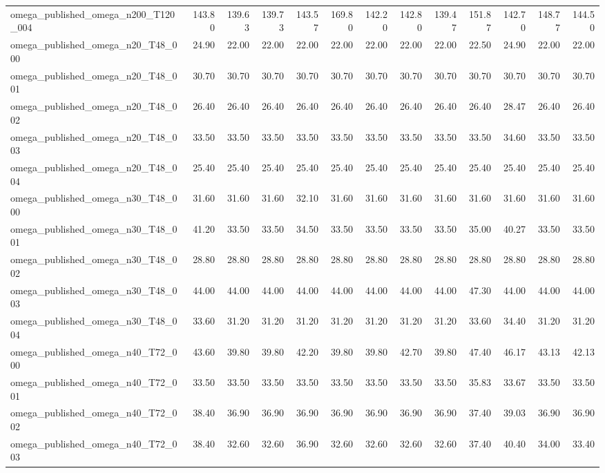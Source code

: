 \begin{table}[htbp]
\begin{tabular}{lrrrrrrrrrrrr}
omega\_published\_omega\_n200\_T120\_004 & 143.80 & 139.63 & 139.73 & 143.57 & 169.80 & 142.20 & 142.80 & 139.47 & 151.87 & 142.70 & 148.77 & 144.50 \\
omega\_published\_omega\_n20\_T48\_000 & 24.90 & 22.00 & 22.00 & 22.00 & 22.00 & 22.00 & 22.00 & 22.00 & 22.50 & 24.90 & 22.00 & 22.00 \\
omega\_published\_omega\_n20\_T48\_001 & 30.70 & 30.70 & 30.70 & 30.70 & 30.70 & 30.70 & 30.70 & 30.70 & 30.70 & 30.70 & 30.70 & 30.70 \\
omega\_published\_omega\_n20\_T48\_002 & 26.40 & 26.40 & 26.40 & 26.40 & 26.40 & 26.40 & 26.40 & 26.40 & 26.40 & 28.47 & 26.40 & 26.40 \\
omega\_published\_omega\_n20\_T48\_003 & 33.50 & 33.50 & 33.50 & 33.50 & 33.50 & 33.50 & 33.50 & 33.50 & 33.50 & 34.60 & 33.50 & 33.50 \\
omega\_published\_omega\_n20\_T48\_004 & 25.40 & 25.40 & 25.40 & 25.40 & 25.40 & 25.40 & 25.40 & 25.40 & 25.40 & 25.40 & 25.40 & 25.40 \\
omega\_published\_omega\_n30\_T48\_000 & 31.60 & 31.60 & 31.60 & 32.10 & 31.60 & 31.60 & 31.60 & 31.60 & 31.60 & 31.60 & 31.60 & 31.60 \\
omega\_published\_omega\_n30\_T48\_001 & 41.20 & 33.50 & 33.50 & 34.50 & 33.50 & 33.50 & 33.50 & 33.50 & 35.00 & 40.27 & 33.50 & 33.50 \\
omega\_published\_omega\_n30\_T48\_002 & 28.80 & 28.80 & 28.80 & 28.80 & 28.80 & 28.80 & 28.80 & 28.80 & 28.80 & 28.80 & 28.80 & 28.80 \\
omega\_published\_omega\_n30\_T48\_003 & 44.00 & 44.00 & 44.00 & 44.00 & 44.00 & 44.00 & 44.00 & 44.00 & 47.30 & 44.00 & 44.00 & 44.00 \\
omega\_published\_omega\_n30\_T48\_004 & 33.60 & 31.20 & 31.20 & 31.20 & 31.20 & 31.20 & 31.20 & 31.20 & 33.60 & 34.40 & 31.20 & 31.20 \\
omega\_published\_omega\_n40\_T72\_000 & 43.60 & 39.80 & 39.80 & 42.20 & 39.80 & 39.80 & 42.70 & 39.80 & 47.40 & 46.17 & 43.13 & 42.13 \\
omega\_published\_omega\_n40\_T72\_001 & 33.50 & 33.50 & 33.50 & 33.50 & 33.50 & 33.50 & 33.50 & 33.50 & 35.83 & 33.67 & 33.50 & 33.50 \\
omega\_published\_omega\_n40\_T72\_002 & 38.40 & 36.90 & 36.90 & 36.90 & 36.90 & 36.90 & 36.90 & 36.90 & 37.40 & 39.03 & 36.90 & 36.90 \\
omega\_published\_omega\_n40\_T72\_003 & 38.40 & 32.60 & 32.60 & 36.90 & 32.60 & 32.60 & 32.60 & 32.60 & 37.40 & 40.40 & 34.00 & 33.40 \\

\end{tabular}
\end{table}
